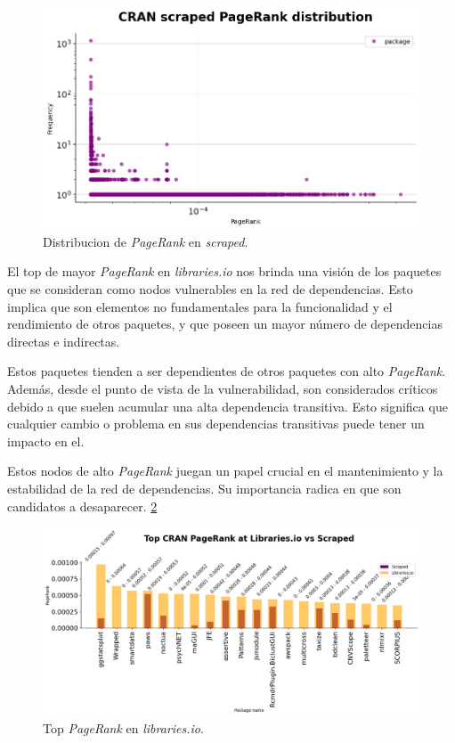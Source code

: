 \begin{figure}[ht!]
    \begin{center}
        \includegraphics[width=1\textwidth]{img/cran/pr2.png}
        \caption{Distribucion de \textit{PageRank} en \textit{scraped}.}
        \label{fig:cran_pr_scraped}
    \end{center}
\end{figure}

El top de mayor \textit{PageRank} en \textit{libraries.io} nos brinda una visión de los paquetes que se
consideran como nodos vulnerables en la red de dependencias. Esto implica que son elementos no fundamentales
para la funcionalidad y el rendimiento de otros paquetes, y que poseen un mayor número de dependencias
directas e indirectas.

Estos paquetes tienden a ser dependientes de otros paquetes con alto \textit{PageRank}. Además, desde el
punto de vista de la vulnerabilidad, son considerados críticos debido a que suelen acumular una alta
dependencia transitiva. Esto significa que cualquier cambio o problema en sus dependencias transitivas puede
tener un impacto en el.

Estos nodos de alto \textit{PageRank} juegan un papel crucial en el mantenimiento y la estabilidad de la
red de dependencias. Su importancia radica en que son candidatos a desaparecer. \ref{fig:cran_pr_libio_top}

\begin{figure}[ht!]
    \begin{center}
        \includegraphics[width=1\textwidth]{img/cran/pr_top.png}
        \caption{Top \textit{PageRank} en \textit{libraries.io}.}
        \label{fig:cran_pr_libio_top}
    \end{center}
\end{figure}


